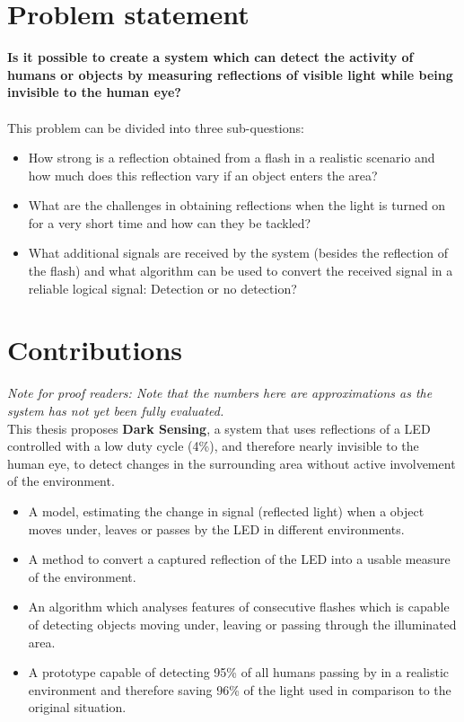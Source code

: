 \section{Problem statement}
\label{Problem statement}
\textbf{Is it possible to create a system which can detect the activity of humans or objects by measuring reflections of visible light while being invisible to the human eye?}
\\
\\
This problem can be divided into three sub-questions:
\begin{itemize}\itemsep2pt
	\item How strong is a reflection obtained from a flash in a realistic scenario and how much does this reflection vary if an object enters the area?
	\item What are the challenges in obtaining reflections when the light is turned on for a very short time and how can they be tackled?
	\item What additional signals are received by the system (besides the reflection of the flash) and what algorithm can be used to convert the received signal in a reliable logical signal: Detection or no detection?
\end{itemize}

\section{Contributions}
\label{sec:Contributions}
\emph{\color{red} Note for proof readers: Note that the numbers here are approximations as the system has not yet been fully evaluated.}
\\
This thesis proposes \textbf{Dark Sensing}, a system that uses reflections of a LED controlled with a low duty cycle (4\%), and therefore nearly invisible to the human eye, to detect changes in the surrounding area without active involvement of the environment.
\begin{itemize}\itemsep2pt
	\item A model, estimating the change in signal (reflected light) when a object moves under, leaves or passes by the LED in different environments.
	\item A method to convert a captured reflection of the LED into a usable measure of the environment.
	\item An algorithm which analyses features of consecutive flashes which is capable of detecting objects moving under, leaving or passing through the illuminated area.
	\item A prototype capable of detecting 95\% of all humans passing by in a realistic environment and therefore saving 96\% of the light used in comparison to the original situation.
\end{itemize}

